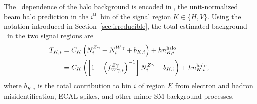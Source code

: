 The \ETg\ dependence of the halo background is encoded in \nhalo[,i], the unit-normalized beam halo prediction in the $i^\mathrm{th}$ bin of the signal region $K \in \{H,V\}$.
Using the notation introduced in Section~\ref{sec:irreducible}, the total estimated background \TK\ in the two signal regions are
\begin{equation}
\begin{aligned}
  \TK[,i] & = C_{K} \left( \NZg[i] + \NWg[i] + b_{K,i}\right) + h \nhalo[,i]  \\
          & = C_{K} \left( \left[1 + \left(\fZW[,i]\right)^{-1}\right] \NZg[i] + b_{K,i}\right) + h \nhalo[,i],
\end{aligned}
\end{equation}
where $b_{K,i}$ is the total contribution to bin $i$ of region $K$ from electron and hadron misidentification, ECAL spikes, and other minor SM background processes.

